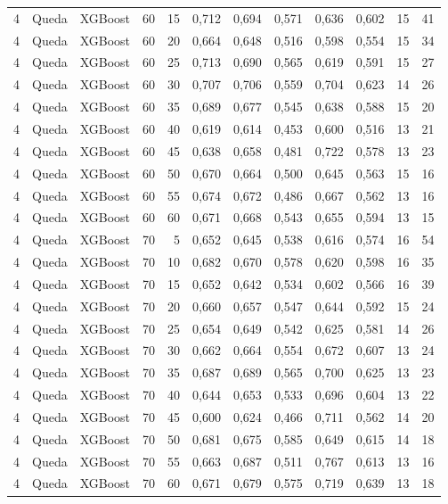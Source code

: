 \begin{longtable}{@{}rllrrrrrrrrr@{}}
4 & Queda & XGBoost & 60 & 15 & 0,712 & 0,694 & 0,571 & 0,636 & 0,602 & 15 & 41 \\
4 & Queda & XGBoost & 60 & 20 & 0,664 & 0,648 & 0,516 & 0,598 & 0,554 & 15 & 34 \\
4 & Queda & XGBoost & 60 & 25 & 0,713 & 0,690 & 0,565 & 0,619 & 0,591 & 15 & 27 \\
4 & Queda & XGBoost & 60 & 30 & 0,707 & 0,706 & 0,559 & 0,704 & 0,623 & 14 & 26 \\
4 & Queda & XGBoost & 60 & 35 & 0,689 & 0,677 & 0,545 & 0,638 & 0,588 & 15 & 20 \\
4 & Queda & XGBoost & 60 & 40 & 0,619 & 0,614 & 0,453 & 0,600 & 0,516 & 13 & 21 \\
4 & Queda & XGBoost & 60 & 45 & 0,638 & 0,658 & 0,481 & 0,722 & 0,578 & 13 & 23 \\
4 & Queda & XGBoost & 60 & 50 & 0,670 & 0,664 & 0,500 & 0,645 & 0,563 & 15 & 16 \\
4 & Queda & XGBoost & 60 & 55 & 0,674 & 0,672 & 0,486 & 0,667 & 0,562 & 13 & 16 \\
4 & Queda & XGBoost & 60 & 60 & 0,671 & 0,668 & 0,543 & 0,655 & 0,594 & 13 & 15 \\
4 & Queda & XGBoost & 70 & 5 & 0,652 & 0,645 & 0,538 & 0,616 & 0,574 & 16 & 54 \\
4 & Queda & XGBoost & 70 & 10 & 0,682 & 0,670 & 0,578 & 0,620 & 0,598 & 16 & 35 \\
4 & Queda & XGBoost & 70 & 15 & 0,652 & 0,642 & 0,534 & 0,602 & 0,566 & 16 & 39 \\
4 & Queda & XGBoost & 70 & 20 & 0,660 & 0,657 & 0,547 & 0,644 & 0,592 & 15 & 24 \\
4 & Queda & XGBoost & 70 & 25 & 0,654 & 0,649 & 0,542 & 0,625 & 0,581 & 14 & 26 \\
4 & Queda & XGBoost & 70 & 30 & 0,662 & 0,664 & 0,554 & 0,672 & 0,607 & 13 & 24 \\
4 & Queda & XGBoost & 70 & 35 & 0,687 & 0,689 & 0,565 & 0,700 & 0,625 & 13 & 23 \\
4 & Queda & XGBoost & 70 & 40 & 0,644 & 0,653 & 0,533 & 0,696 & 0,604 & 13 & 22 \\
4 & Queda & XGBoost & 70 & 45 & 0,600 & 0,624 & 0,466 & 0,711 & 0,562 & 14 & 20 \\
4 & Queda & XGBoost & 70 & 50 & 0,681 & 0,675 & 0,585 & 0,649 & 0,615 & 14 & 18 \\
4 & Queda & XGBoost & 70 & 55 & 0,663 & 0,687 & 0,511 & 0,767 & 0,613 & 13 & 16 \\
4 & Queda & XGBoost & 70 & 60 & 0,671 & 0,679 & 0,575 & 0,719 & 0,639 & 13 & 18 \\

\end{longtable}
